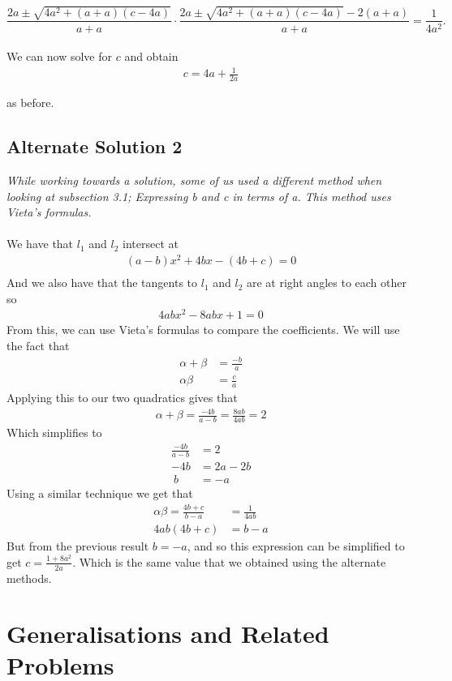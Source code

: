 \documentclass[a4paper,11pt]{article}
\theoremstyle{definition}
\begin{document}
\[
\frac{2a\pm\sqrt{4a^2+(a+a)(c-4a)}}{a+a}
\cdot
\frac{2a\pm\sqrt{4a^2+(a+a)(c-4a)}-2(a+a)}{a+a}
=\frac{1}{4a^2} .
\]
\\ We can now solve for $c$ and obtain
\begin{align*}
    c = 4a + \frac{1}{2a}
\end{align*}

\noindent as before.
\subsection{Alternate Solution 2}
\textit{While working towards a solution, some of us used a different method when looking at subsection 3.1; Expressing b and c in terms of a. This method uses Vieta's formulas.}\\
\\We have that $l_1$ and $l_2$ intersect at 
\begin{align*}
    (a-b)x^2+4bx-(4b+c)=0\\
\end{align*}
And we also have that the tangents to $l_1$ and $l_2$ are at right angles to each other so 
\begin{align*}
    4abx^2-8abx+1=0
\end{align*}
From this, we can use Vieta's formulas to compare the coefficients. We will use the fact that 
\begin{align*}
    \alpha+\beta&=\frac{-b}{a}\\
    \alpha\beta&=\frac{c}{a}
\end{align*}
Applying this to our two quadratics gives that 
\begin{align*}
    \alpha+\beta=\frac{-4b}{a-b}=\frac{8ab}{4ab}=2
\end{align*}
Which simplifies to 
\begin{align*}
    \frac{-4b}{a-b}&=2\\
    -4b&=2a-2b\\\
    b&=-a
\end{align*}
Using a similar technique we get that
\begin{align*}
    \alpha\beta=\frac{4b+c}{b-a}&=\frac{1}{4ab}\\
    4ab(4b+c)&=b-a
\end{align*}
But from the previous result $b=-a$, and so this expression can be simplified to get $c=\frac{1+8a^2}{2a}$. Which is the same value that we obtained using the alternate methods.


\section{Generalisations and Related Problems}
\end{document}
